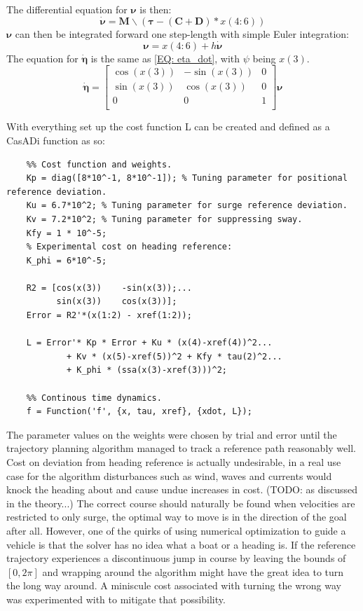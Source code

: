 The differential equation for $\bm{\nu}$ is then:
\begin{equation}
    \dot{\bm{\nu}} = \textbf{M}\backslash(\bm{\tau} - (\textbf{C}+\textbf{D})*x(4:6))
\end{equation}
$\bm{\nu}$ can then be integrated forward one step-length with simple Euler integration:
\begin{equation}
    \bm{\nu} = x(4:6) + h\dot{\bm{\nu}}
\end{equation}
The equation for $\dot{\bm{\eta}}$ is the same as \eqref{EQ: eta_dot}, with $\psi$ being $x(3)$.
\begin{equation}
    \dot{\bm{\eta}} = \begin{bmatrix}
        \cos(x(3)) & -\sin(x(3)) & 0\\
        \sin(x(3)) & \cos(x(3)) & 0\\
        0 & 0 & 1 \\
    \end{bmatrix} \bm{\nu}
\end{equation}

With everything set up the cost function L can be created and defined as a CasADi function as so:
\begin{lstlisting}
    %% Cost function and weights.
    Kp = diag([8*10^-1, 8*10^-1]); % Tuning parameter for positional reference deviation.
    Ku = 6.7*10^2; % Tuning parameter for surge reference deviation.
    Kv = 7.2*10^2; % Tuning parameter for suppressing sway.
    Kfy = 1 * 10^-5;
    % Experimental cost on heading reference:
    K_phi = 6*10^-5;

    R2 = [cos(x(3))    -sin(x(3));...
          sin(x(3))    cos(x(3))];
    Error = R2'*(x(1:2) - xref(1:2));

    L = Error'* Kp * Error + Ku * (x(4)-xref(4))^2...
            + Kv * (x(5)-xref(5))^2 + Kfy * tau(2)^2...
            + K_phi * (ssa(x(3)-xref(3)))^2;
    
    %% Continous time dynamics.
    f = Function('f', {x, tau, xref}, {xdot, L});    
\end{lstlisting}

The parameter values on the weights were chosen by trial and error until the trajectory planning algorithm managed
to track a reference path reasonably well. Cost on deviation from heading reference is actually undesirable, in a real use case
for the algorithm disturbances such as wind, waves and currents would knock the heading about and cause undue increases in cost.
(TODO: as discussed in the theory...) The correct course should naturally be found when velocities are restricted to only
surge, the optimal way to move is in the direction of the goal after all. However, one of the quirks of using numerical optimization 
to guide a vehicle is that the solver has no idea what a boat or a heading is. If the reference trajectory experiences a discontinuous
jump in course by leaving the bounds of $[0, 2\pi]$ and wrapping around the algorithm might have the great idea to turn the long way around.
A miniscule cost associated with turning the wrong way was experimented with to mitigate that possibility.

